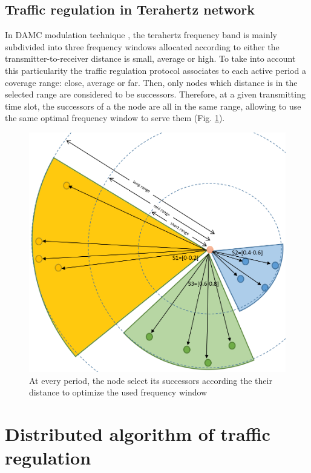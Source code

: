 \documentclass[letterpaper, 10 pt, conference]{ieeeconf}
\begin{document}
\subsection{Traffic regulation in Terahertz network}

In DAMC modulation technique \cite{damc}, the terahertz frequency band is mainly subdivided into three frequency windows allocated according to either the transmitter-to-receiver distance is small, average or high. To take into account this particularity the traffic regulation protocol associates to each active period a coverage range: close, average or far. Then, only nodes which distance is in the selected range are considered to be successors. Therefore, at a given transmitting time slot, the successors of a the node are all in the same range, allowing to use the same optimal frequency window to serve them (Fig. \ref{DAMC}).

\begin{figure}[h]
\centering
\includegraphics[width=\columnwidth]{DAMC.png}
\caption{At every period, the node select its successors according the their distance to optimize the used frequency window}
\label{DAMC}
\end{figure}

\section{Distributed algorithm of traffic regulation}
\end{document}
